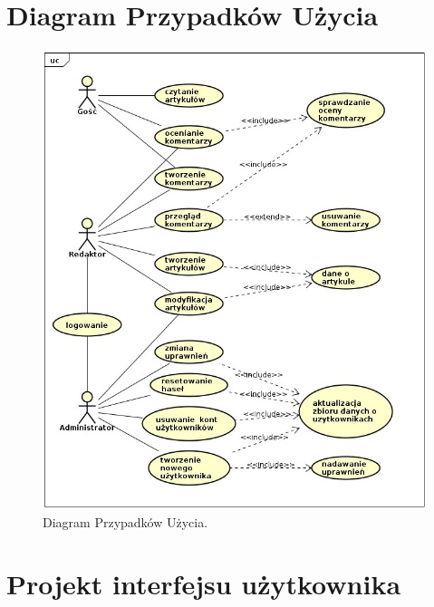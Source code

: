 \documentclass[openright]{xmgr}
\begin{document}
\section{Diagram Przypadków Użycia}
\begin{figure}[!tbh]
\centering
\includegraphics[width=.9\linewidth]{fig/uc}
\caption{Diagram Przypadków Użycia.\label{RYS.6}}
\end{figure}

\section{Projekt interfejsu użytkownika}
\end{document}
